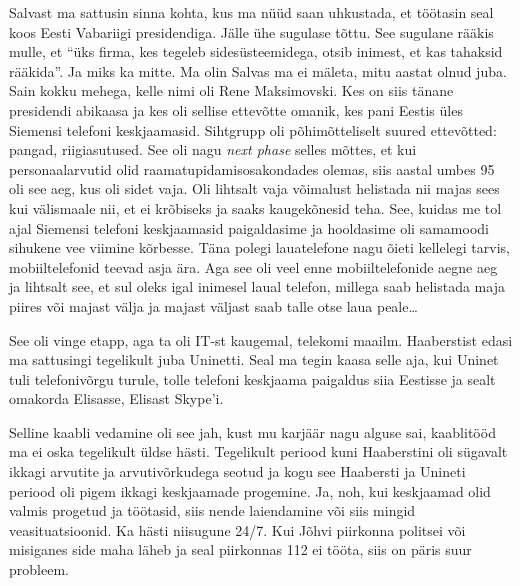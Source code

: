 Salvast ma sattusin sinna kohta, kus ma nüüd saan uhkustada, et  töötasin seal 
koos Eesti Vabariigi presidendiga. Jälle ühe sugulase tõttu. See sugulane 
rääkis mulle, et \enquote{üks firma, kes tegeleb sidesüsteemidega, otsib 
inimest, et kas tahaksid rääkida}. Ja miks ka mitte. Ma olin Salvas ma ei 
mäleta, mitu aastat olnud juba. Sain kokku mehega, kelle nimi oli Rene 
Maksimovski. Kes on siis tänane presidendi 
abikaasa ja kes oli  sellise ettevõtte omanik, kes pani Eestis üles Siemensi 
telefoni keskjaamasid. Sihtgrupp oli põhimõtteliselt suured ettevõtted: pangad, 
riigiasutused. See oli nagu \emph{next phase} selles mõttes, et kui 
personaalarvutid olid raamatupidamisosakondades olemas, siis aastal umbes 95 
oli see aeg, kus oli sidet vaja. Oli lihtsalt vaja võimalust helistada nii 
majas sees kui välismaale nii, et ei krõbiseks ja saaks kaugekõnesid teha. See, 
kuidas me tol ajal Siemensi telefoni keskjaamasid paigaldasime ja hooldasime 
oli samamoodi sihukene vee viimine kõrbesse. Täna polegi lauatelefone nagu 
õieti kellelegi tarvis, mobiiltelefonid teevad asja ära. Aga see oli veel enne 
mobiiltelefonide aegne aeg ja lihtsalt see, et sul oleks igal inimesel laual 
telefon, millega saab helistada maja piires või majast välja ja majast väljast 
saab talle otse laua peale\ldots 


See oli vinge etapp, aga ta oli IT-st kaugemal, telekomi maailm. Haaberstist 
edasi ma sattusingi tegelikult juba Uninetti. Seal ma tegin kaasa selle aja, 
kui Uninet tuli telefonivõrgu turule, tolle telefoni keskjaama paigaldus siia 
Eestisse ja sealt omakorda Elisasse, Elisast Skype'i. 


Selline kaabli vedamine oli see jah, kust mu karjäär nagu alguse sai, 
kaablitööd ma ei oska tegelikult üldse hästi. Tegelikult periood kuni Haaberstini oli 
sügavalt ikkagi arvutite ja arvutivõrkudega  seotud ja kogu see Haabersti ja 
Unineti periood oli pigem ikkagi keskjaamade progemine. Ja, noh, kui keskjaamad 
olid valmis progetud ja töötasid, siis nende laiendamine või siis mingid 
veasituatsioonid. Ka hästi niisugune 24/7. Kui Jõhvi piirkonna politsei või 
misiganes side maha läheb ja seal piirkonnas 112 ei tööta, siis on päris suur 
probleem. 

